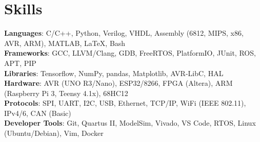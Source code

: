 

\section{Skills}
 \begin{itemize}[leftmargin=0.15in, label={}]
    \small{\item{
     \textbf{Languages}{: C/C++, Python, Verilog, VHDL, Assembly (6812, MIPS, x86, AVR, ARM), MATLAB, LaTeX, Bash} \\
     \textbf{Frameworks}{: GCC, LLVM/Clang, GDB, FreeRTOS, PlatformIO, JUnit, ROS, APT, PIP} \\
     \textbf{Libraries}{: Tensorflow, NumPy, pandas, Matplotlib, AVR-LibC, HAL} \\
     \textbf{Hardware}{: AVR (UNO R3/Nano), ESP32/8266, FPGA (Altera), ARM (Raspberry Pi 3, Teensy 4.1x), 68HC12} \\
     \textbf{Protocols}{: SPI, UART, I2C, USB, Ethernet, TCP/IP, WiFi (IEEE 802.11), IPv4/6, CAN (Basic)} \\
     \textbf{Developer Tools}{: Git, Quartus II, ModelSim, Vivado, VS Code, RTOS, Linux (Ubuntu/Debian), Vim, Docker} \\
    }}
    \spaceReducerMini
 \end{itemize}

 